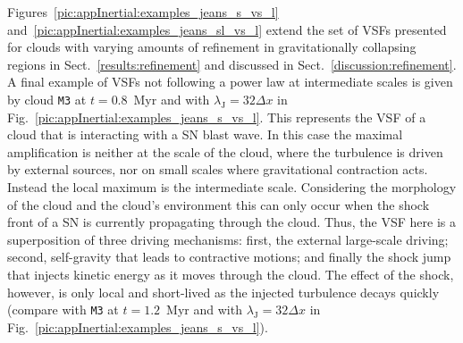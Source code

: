 \documentclass{aa}		%
\begin{document}
Figures~\ref{pic:appInertial:examples_jeans_s_vs_l} and~\ref{pic:appInertial:examples_jeans_sl_vs_l} extend the set of VSFs presented for clouds with varying amounts of refinement in gravitationally collapsing regions in Sect.~\ref{results:refinement} and discussed in Sect.~\ref{discussion:refinement}.
A final example of VSFs not following a power law at intermediate scales is given by cloud \texttt{M3} at $t=0.8$~Myr and with $\lambda_\mathrm{J} = 32\Delta x$ in Fig.~\ref{pic:appInertial:examples_jeans_s_vs_l}.
This represents the VSF of a cloud that is interacting with a SN blast wave.
In this case the maximal amplification is neither at the scale of the cloud, where the turbulence is driven by external sources, nor on small scales where gravitational contraction acts.
Instead the local maximum is the intermediate scale. 
Considering the morphology of the cloud and the cloud's environment this can only occur when the shock front of a SN is currently propagating through the cloud. 
Thus, the VSF here is a superposition of three driving mechanisms:
first, the external large-scale driving; second, self-gravity that leads to contractive motions; and finally the shock jump that injects kinetic energy as it moves through the cloud. 
The effect of the shock, however, is only local and short-lived as the injected turbulence decays quickly (compare with \texttt{M3} at $t=1.2$~Myr and with $\lambda_\mathrm{J} = 32\Delta x$ in Fig.~\ref{pic:appInertial:examples_jeans_s_vs_l}).




        
\end{document}
